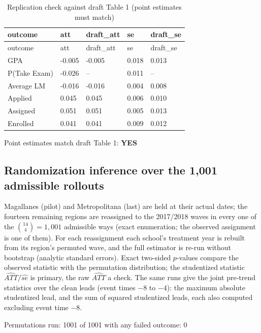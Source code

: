 \documentclass[
]{article}
\begin{document}
\begin{longtable}[]{@{}lllll@{}}
\caption{Replication check against draft Table 1 (point estimates must
match)}\tabularnewline
\toprule
outcome & att & draft\_att & se & draft\_se \\
\midrule
\endfirsthead
\toprule
outcome & att & draft\_att & se & draft\_se \\
\midrule
\endhead
GPA & -0.005 & -0.005 & 0.018 & 0.013 \\
P(Take Exam) & -0.026 & -- & 0.011 & -- \\
Average LM & -0.016 & -0.016 & 0.004 & 0.008 \\
Applied & 0.045 & 0.045 & 0.006 & 0.010 \\
Assigned & 0.051 & 0.051 & 0.005 & 0.013 \\
Enrolled & 0.041 & 0.041 & 0.009 & 0.012 \\
\bottomrule
\end{longtable}

Point estimates match draft Table 1: \textbf{YES}

\hypertarget{randomization-inference-over-the-1001-admissible-rollouts}{%
\subsection{Randomization inference over the 1,001 admissible
rollouts}\label{randomization-inference-over-the-1001-admissible-rollouts}}

Magallanes (pilot) and Metropolitana (last) are held at their actual
dates; the fourteen remaining regions are reassigned to the 2017/2018
waves in every one of the \(\binom{14}{4} = 1{,}001\) admissible ways
(exact enumeration; the observed assignment is one of them). For each
reassignment each school's treatment year is rebuilt from its region's
permuted wave, and the full estimator is re-run without bootstrap
(analytic standard errors). Exact two-sided \(p\)-values compare the
observed statistic with the permutation distribution; the studentized
statistic \(\hat{ATT}/\widehat{se}\) is primary, the raw \(\hat{ATT}\) a
check. The same runs give the joint pre-trend statistics over the clean
leads (event times \(-8\) to \(-4\)): the maximum absolute studentized
lead, and the sum of squared studentized leads, each also computed
excluding event time \(-8\).

Permutations run: 1001 of 1001 \textbar{} with any failed outcome: 0
\end{document}
